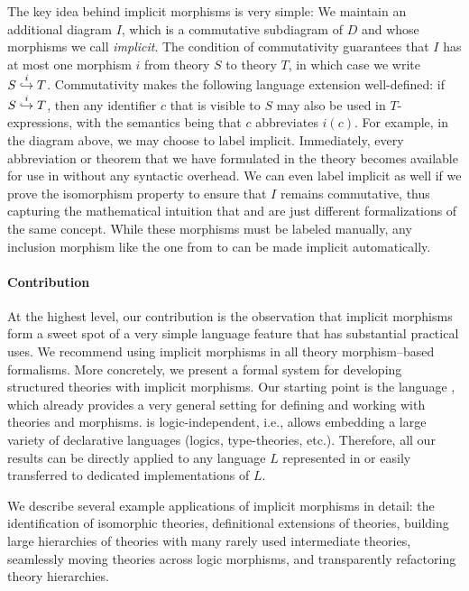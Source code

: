 The key idea behind implicit morphisms is very simple:
We maintain an additional diagram $I$, which is a commutative subdiagram of $D$ and whose morphisms we call \emph{implicit}.
The condition of commutativity guarantees that $I$ has at most one morphism $i$ from theory $S$ to theory $T$, in which case we write $\ipc{i}{S}{T}$.
Commutativity makes the following language extension well-defined: if $\ipc{i}{S}{T}$, then any identifier $c$ that is visible to $S$ may also be used in $T$-expressions, with the semantics being that $c$ abbreviates $i(c)$.
For example, in the diagram above, we may choose to label  implicit.
Immediately, every abbreviation or theorem that we have formulated in the theory  becomes available for use in  without any syntactic overhead.
We can even label  implicit as well if we prove the isomorphism property to ensure that $I$ remains commutative, thus capturing the mathematical intuition that  and  are just different formalizations of the same concept.
While these morphisms must be labeled manually, any inclusion morphism like the one from  to  can be made implicit automatically.

\paragraph{Contribution}
At the highest level, our contribution is the observation that implicit morphisms form a sweet spot of a very simple language feature that has substantial practical uses.
We recommend using implicit morphisms in all theory morphism--based formalisms.
More concretely, we present a formal system for developing structured theories with implicit morphisms.
Our starting point is the \mmt language \cite{RK:mmt:10}, which already provides a very general setting for defining and working with theories and morphisms.
\mmt is logic-independent, i.e., allows embedding a large variety of declarative languages (logics, type-theories, etc.).
Therefore, all our results can be directly applied to any language $L$ represented in \mmt or easily transferred to dedicated implementations of $L$.

We describe several example applications of implicit morphisms in detail: the identification of isomorphic theories, definitional extensions of theories, building large hierarchies of theories with many rarely used intermediate theories, seamlessly moving theories across logic morphisms, and transparently refactoring theory hierarchies.

